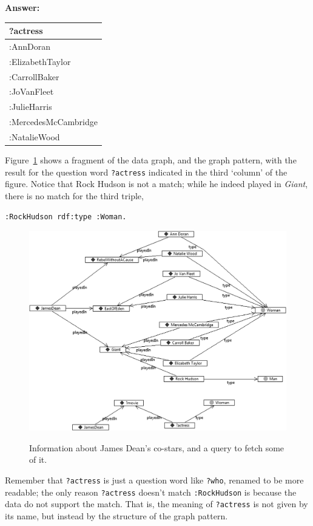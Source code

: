 \textbf{\textbf{Answer:}}

\begin{tabular}{|l|}
\hline
?actress\\
\hline
:AnnDoran\\
:ElizabethTaylor\\
:CarrollBaker\\
:JoVanFleet\\
:JulieHarris\\
:MercedesMcCambridge\\
:NatalieWood\\
\hline
\end{tabular}

Figure~\ref{fig:ch6.4} shows a fragment of the data graph, and the graph pattern,
with the result for the question word \texttt{?actress} indicated in the third
`column' of the figure. Notice that Rock Hudson is not a match; while he
indeed played in \emph{Giant}, there is no match for the third triple,

\begin{lstlisting}
:RockHudson rdf:type :Woman.
\end{lstlisting}

\begin{figure}
\centering
\includegraphics[width=5in]{media/ch6/f06-04.png}
\label{fig:ch6.4}
\caption{Information about James Dean's co-stars, and a query to fetch some of it.}
\end{figure}

Remember that \texttt{?actress} is just a question word like \texttt{?who}, renamed to be
more readable; the only reason \texttt{?actress} doesn't match \texttt{:RockHudson} is
because the data do not support the match. That is, the meaning of
\texttt{?actress} is not given by its name, but instead by the structure of the
graph pattern.

